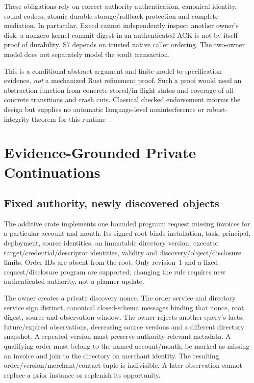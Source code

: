 \documentclass[letterpaper,twocolumn,10pt]{article}
\newcommand{\code}[1]{\texttt{\detokenize{#1}}}
\begin{document}
These obligations rely on correct authority authentication, canonical identity,
sound codecs, atomic durable storage/rollback protection and complete
mediation. In particular, Execd cannot independently inspect another owner's
disk: a nonzero kernel commit digest in an authenticated ACK is not by itself
proof of durability. S7 depends on trusted native caller ordering.
The two-owner model does not separately model the vault transaction.

This is a conditional abstract argument and finite model-to-specification
evidence, \emph{not} a mechanized Rust refinement proof. Such a proof would need
an abstraction function from concrete stored/in-flight states and coverage of
all concrete transitions and crash cuts. Classical checked endorsement informs
the design but supplies no automatic language-level noninterference or
robust-integrity theorem for this runtime~\cite{askarov2011}.

\section{Evidence-Grounded Private Continuations}
\label{sec:continuations}

\subsection{Fixed authority, newly discovered objects}

The additive \code{savana-private-workflow} crate implements one bounded
program: request missing invoices for a particular account and month. Its
signed root binds installation, task, principal, deployment, source identities,
an immutable directory version, executor target/credential/descriptor identities,
validity and discovery/object/disclosure limits. Order IDs are absent from the
root. Only revision~1 and a fixed request/disclosure program are supported;
changing the rule requires new authenticated authority, not a planner update.

The owner creates a private discovery nonce. The order service and directory
service sign distinct, canonical closed-schema messages binding that nonce,
root digest, source and observation window. The owner rejects another query's
facts, future/expired observations, decreasing source versions and a different
directory snapshot. A repeated version must preserve authority-relevant
metadata. A qualifying order must belong to the named account/month, be marked
as missing an invoice and join to the directory on merchant identity.
The resulting order/version/merchant/contact tuple is indivisible. A later
observation cannot replace a prior instance or replenish its opportunity.
\end{document}
